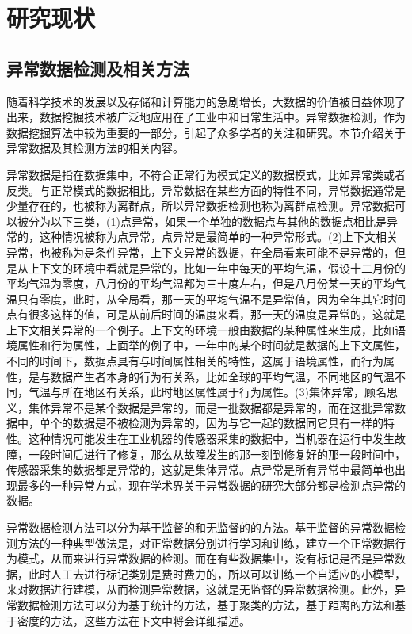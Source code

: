 \chapter{研究现状}
\label{chap:intro}
\section{异常数据检测及相关方法}
随着科学技术的发展以及存储和计算能力的急剧增长，大数据的价值被日益体现了出来，数据挖掘技术被广泛地应用在了工业中和日常生活中。异常数据检测，作为数据挖掘算法中较为重要的一部分，引起了众多学者的关注和研究。本节介绍关于异常数据及其检测方法的相关内容。

异常数据是指在数据集中，不符合正常行为模式定义的数据模式，比如异常类或者反类。与正常模式的数据相比，异常数据在某些方面的特性不同，异常数据通常是少量存在的，也被称为离群点，所以异常数据检测也称为离群点检测。异常数据可以被分为以下三类，(1)点异常，如果一个单独的数据点与其他的数据点相比是异常的，这种情况被称为点异常，点异常是最简单的一种异常形式。(2)上下文相关异常，也被称为是条件异常，上下文异常的数据，在全局看来可能不是异常的，但是从上下文的环境中看就是异常的，比如一年中每天的平均气温，假设十二月份的平均气温为零度，八月份的平均气温都为三十度左右，但是八月份某一天的平均气温只有零度，此时，从全局看，那一天的平均气温不是异常值，因为全年其它时间点有很多这样的值，可是从前后时间的温度来看，那一天的温度是异常的，这就是上下文相关异常的一个例子。上下文的环境一般由数据的某种属性来生成，比如语境属性和行为属性，上面举的例子中，一年中的某个时间就是数据的上下文属性，不同的时间下，数据点具有与时间属性相关的特性，这属于语境属性，而行为属性，是与数据产生者本身的行为有关系，比如全球的平均气温，不同地区的气温不同，气温与所在地区有关系，此时地区属性属于行为属性。(3)集体异常，顾名思义，集体异常不是某个数据是异常的，而是一批数据都是异常的，而在这批异常数据中，单个的数据是不被检测为异常的，因为与它一起的数据同它具有一样的特性。这种情况可能发生在工业机器的传感器采集的数据中，当机器在运行中发生故障，一段时间后进行了修复，那么从故障发生的那一刻到修复好的那一段时间中，传感器采集的数据都是异常的，这就是集体异常。点异常是所有异常中最简单也出现最多的一种异常方式，现在学术界关于异常数据的研究大部分都是检测点异常的数据。 

异常数据检测方法可以分为基于监督的和无监督的的方法。基于监督的异常数据检测方法的一种典型做法是，对正常数据分别进行学习和训练，建立一个正常数据行为模式，从而来进行异常数据的检测。而在有些数据集中，没有标记是否是异常数据，此时人工去进行标记类别是费时费力的，所以可以训练一个自适应的小模型，来对数据进行建模，从而检测异常数据，这就是无监督的异常数据检测。此外，异常数据检测方法可以分为基于统计的方法，基于聚类的方法，基于距离的方法和基于密度的方法，这些方法在下文中将会详细描述。

